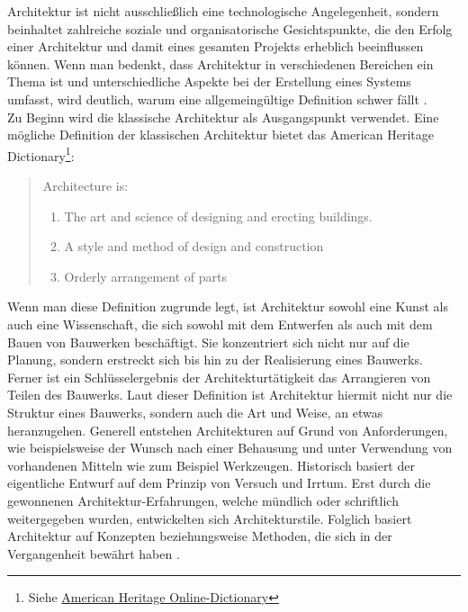 Architektur ist nicht ausschließlich eine technologische Angelegenheit, sondern beinhaltet zahlreiche soziale und organisatorische Gesichtspunkte, die den Erfolg einer Architektur und damit eines gesamten Projekts erheblich beeinflussen können. Wenn man bedenkt, dass Architektur in verschiedenen Bereichen ein Thema ist und unterschiedliche Aspekte bei der Erstellung eines Systems umfasst, wird deutlich, warum eine allgemeingültige Definition schwer fällt \citereset \autocite{Vogel.2009}.\\
Zu Beginn wird die klassische Architektur als Ausgangspunkt verwendet. Eine mögliche Definition der klassischen Architektur bietet das \glqq American Heritage Dictionary\footnote{Siehe \href{http://ahdictionary.com/word/search.html?q=architecture&submit.x=39&submit.y=20}{American Heritage Online-Dictionary}}\grqq :
\begin{quote}
  Architecture is:
  \begin{enumerate}
    \item The art and science of designing and erecting buildings.
    \item A style and method of design and construction
    \item Orderly arrangement of parts
  \end{enumerate}
\end{quote}

Wenn man diese Definition zugrunde legt, ist Architektur sowohl eine Kunst als auch eine Wissenschaft, die sich sowohl mit dem Entwerfen als auch mit dem Bauen von Bauwerken beschäftigt. Sie konzentriert sich nicht nur auf die Planung, sondern erstreckt sich bis hin zu der Realisierung eines Bauwerks. Ferner ist ein Schlüsselergebnis der Architekturtätigkeit das Arrangieren von Teilen des Bauwerks. Laut dieser Definition ist Architektur hiermit nicht nur die Struktur eines Bauwerks, sondern auch die Art und Weise, an etwas heranzugehen. Generell entstehen Architekturen auf Grund von Anforderungen, wie beispielsweise der Wunsch nach einer Behausung und unter Verwendung von vorhandenen Mitteln wie zum Beispiel Werkzeugen. Historisch basiert der eigentliche Entwurf auf dem Prinzip von Versuch und Irrtum. Erst durch die gewonnenen Architektur-Erfahrungen, welche mündlich oder schriftlich weitergegeben wurden, entwickelten sich Architekturstile. Folglich basiert Architektur auf Konzepten beziehungsweise Methoden, die sich in der Vergangenheit bewährt haben \citereset \autocite{Vogel.2009}.\\

